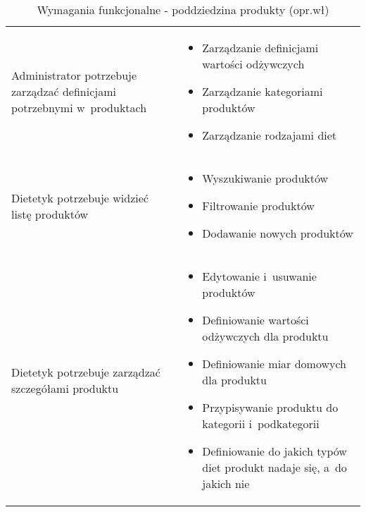 
\begin{minipage}{\textwidth}
    \begin{table}[H]
        \centering\caption{Wymagania funkcjonalne - poddziedzina produkty (opr.wł)\label{tabela:wymaganiaFunkcjonalneProdukty}}
        \begin{tabular}{|P{.3\textwidth}|P{.6\textwidth}|}
            \hline
             &  \\

            \hline
            Administrator potrzebuje zarządzać definicjami potrzebnymi w~produktach &
            \begin{itemize}
                \item Zarządzanie definicjami wartości odżywczych
                \item Zarządzanie kategoriami produktów
                \item Zarządzanie rodzajami diet
            \end{itemize} \\
            \hline
            Dietetyk potrzebuje widzieć listę produktów &
            \begin{itemize}
                \item Wyszukiwanie produktów
                \item Filtrowanie produktów
                \item Dodawanie nowych produktów
            \end{itemize} \\
            \hline
            Dietetyk potrzebuje zarządzać szczegółami produktu &
            \begin{itemize}
                \item Edytowanie i~usuwanie produktów
                \item Definiowanie wartości odżywczych dla produktu
                \item Definiowanie miar domowych dla produktu
                \item Przypisywanie produktu do kategorii i~podkategorii
                \item Definiowanie do jakich typów diet produkt nadaje się, a~do jakich nie
            \end{itemize} \\
            \hline
        \end{tabular}
    \end{table}
\end{minipage}

